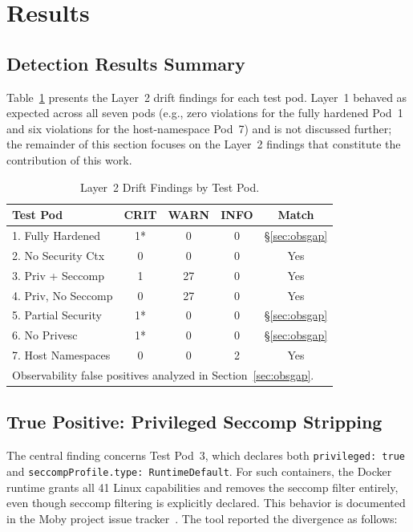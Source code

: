 \documentclass[sigconf]{acmart}
\begin{document}
\section{Results}

\subsection{Detection Results Summary}

Table~\ref{tab:results} presents the Layer~2 drift findings for each test pod. Layer~1 behaved as expected across all seven pods (e.g., zero violations for the fully hardened Pod~1 and six violations for the host-namespace Pod~7) and is not discussed further; the remainder of this section focuses on the Layer~2 findings that constitute the contribution of this work.

\begin{table}[htbp]
\caption{Layer~2 Drift Findings by Test Pod.}
\label{tab:results}
\centering
\begin{tabular}{lcccc}
\toprule
\textbf{Test Pod} & \textbf{CRIT} & \textbf{WARN} & \textbf{INFO} & \textbf{Match} \\
\midrule
1. Fully Hardened   & 1*  & 0  & 0 & \S\ref{sec:obsgap} \\
2. No Security Ctx  & 0   & 0  & 0 & Yes \\
3. Priv + Seccomp   & 1   & 27 & 0 & Yes \\
4. Priv, No Seccomp & 0   & 27 & 0 & Yes \\
5. Partial Security & 1*  & 0  & 0 & \S\ref{sec:obsgap} \\
6. No Privesc       & 1*  & 0  & 0 & \S\ref{sec:obsgap} \\
7. Host Namespaces  & 0   & 0  & 2 & Yes \\
\bottomrule
\multicolumn{5}{l}{\footnotesize *Observability false positives analyzed in Section~\ref{sec:obsgap}.}
\end{tabular}
\end{table}

\subsection{True Positive: Privileged Seccomp Stripping}

The central finding concerns Test Pod~3, which declares both \texttt{privileged: true} and \texttt{seccompProfile.type: RuntimeDefault}. For such containers, the Docker runtime grants all 41 Linux capabilities and removes the seccomp filter entirely, even though seccomp filtering is explicitly declared. This behavior is documented in the Moby project issue tracker~\cite{moby41321}. The tool reported the divergence as follows:
\end{document}
